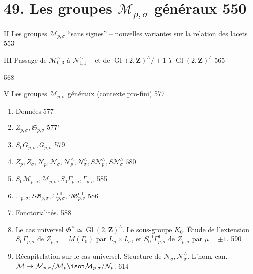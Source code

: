 
\section*{49. Les groupes $\mathcal{M}_{p,\sigma}$ généraux \hfill 550}


\noindent II Les groupes $\mathcal{M}_{p,\sigma}$ ``sans signes'' -- nouvelles variantes sur la relation des lacets \hfill 553

\noindent III Passage de $\mathcal{M}_{0,3}^{\sim}$ à $\mathcal{N}_{1,1}^{\sim}$ -- et de $\operatorname{Gl}(2, \mathbf{Z})^{\wedge} / \pm 1$ à $\operatorname{Gl}(2, \mathbf{Z})^{\wedge}$ \hfill 565

 \hfill 568

\noindent V Les groupes $\mathcal{M}_{p,\sigma}$ généraux (contexte pro-fini) \hfill 577
\begin{enumerate}
\item[1º)] Données \hfill 577
\item[2º)] $Z_{p,\sigma}, \mathfrak{S}_{p,\sigma}$ \hfill 577'
\item[3º)] $S_0 G_{p,\sigma}, G_{p,\sigma}$ \hfill 579
\item[4º)] $Z_p, Z_\sigma, \mathcal{N}_p, \mathcal{N}_\sigma, \mathcal{N}_p^\wedge, \mathcal{N}_\sigma^\wedge, S\mathcal{N}_p^\wedge, S\mathcal{N}_\sigma^\wedge$ \hfill 580
\item[5º)] $S_0 \mathcal{M}_{p,\sigma}, \mathcal{M}_{p,\sigma}, S_0 \Gamma_{p,\sigma}, \Gamma_{p,\sigma}$ \hfill 585
\item[6º)] $\Xi_{p,\sigma}, S\mathfrak{G}_{p,\sigma}, \Xi_{p,\sigma}^{\text{eff}}, S\mathfrak{G}_{p,\sigma}^{\text{eff}}$ \hfill 586
\item[7º)] Fonctorialités. \hfill 588
\item[8º)]  Le cas universel $\mathfrak{G}^\wedge \simeq \operatorname{Gl}(2, \mathbf{Z})^\wedge$. Le sous-groupe $K_0$. Étude de l'extension $S_0 \Gamma_{p,\sigma}$ de $Z_{p,\sigma} = M(\Gamma_0)$ par $L_p \times L_\sigma$, et $S_0^{\text{eff}} \Gamma_{p,\sigma}^1$ de $Z_{p,\sigma}$ par $\mu = \pm 1$. \hfill 590
\item[9º)] Récapitulation sur le cas universel. Structure de $\mathcal{N}_\sigma, \mathcal{N}_\sigma^\wedge$. L'hom. can. $\mathcal{M} \to \mathcal{M}_{p,\sigma} / \mathcal{M}_p \isom \mathcal{M}_{p,\sigma} / \mathcal{N}_p$. \hfill 614
\end{enumerate}

